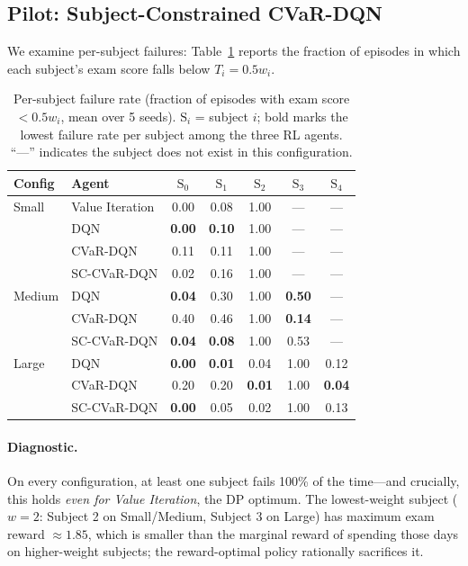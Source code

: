 \documentclass[a4paper,11pt]{article}
\theoremstyle{definition}
\begin{document}
\subsection{Pilot: Subject-Constrained CVaR-DQN}
\label{sec:pilot}

We examine per-subject failures: Table~\ref{tab:per_subject} reports the fraction of episodes in which each subject's exam score falls below $T_i = 0.5 w_i$.

\begin{table}[H]
\centering
\caption{Per-subject failure rate (fraction of episodes with exam score $< 0.5 w_i$, mean over 5 seeds). $\mathrm{S}_i$ = subject $i$; bold marks the lowest failure rate per subject among the three RL agents. ``---'' indicates the subject does not exist in this configuration.}
\label{tab:per_subject}
\begin{tabular}{llccccc}
\toprule
Config & Agent & $\mathrm{S}_0$ & $\mathrm{S}_1$ & $\mathrm{S}_2$ & $\mathrm{S}_3$ & $\mathrm{S}_4$ \\
\midrule
Small
& Value Iteration & 0.00 & 0.08 & 1.00 & --- & --- \\
& DQN             & \textbf{0.00} & \textbf{0.10} & 1.00 & --- & --- \\
& CVaR-DQN        & 0.11 & 0.11 & 1.00 & --- & --- \\
& SC-CVaR-DQN     & 0.02 & 0.16 & 1.00 & --- & --- \\
\midrule
Medium
& DQN             & \textbf{0.04} & 0.30 & 1.00 & \textbf{0.50} & --- \\
& CVaR-DQN        & 0.40 & 0.46 & 1.00 & \textbf{0.14} & --- \\
& SC-CVaR-DQN     & \textbf{0.04} & \textbf{0.08} & 1.00 & 0.53 & --- \\
\midrule
Large
& DQN             & \textbf{0.00} & \textbf{0.01} & 0.04 & 1.00 & 0.12 \\
& CVaR-DQN        & 0.20 & 0.20 & \textbf{0.01} & 1.00 & \textbf{0.04} \\
& SC-CVaR-DQN     & \textbf{0.00} & 0.05 & 0.02 & 1.00 & 0.13 \\
\bottomrule
\end{tabular}
\end{table}


\paragraph{Diagnostic.} On every configuration, at least one subject fails 100\% of the time---and crucially, this holds \emph{even for Value Iteration}, the DP optimum. The lowest-weight subject ($w=2$: Subject 2 on Small/Medium, Subject 3 on Large) has maximum exam reward $\approx 1.85$, which is smaller than the marginal reward of spending those days on higher-weight subjects; the reward-optimal policy rationally sacrifices it.
\end{document}
